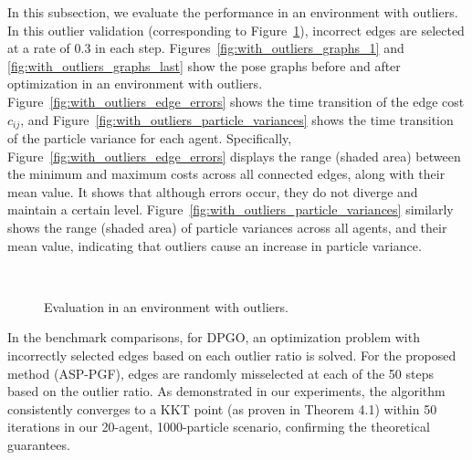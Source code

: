In this subsection, we evaluate the performance in an environment with outliers. In this outlier validation (corresponding to Figure~\ref{fig:eval_with_outliers}), incorrect edges are selected at a rate of 0.3 in each step.
Figures~\ref{fig:with_outliers_graphs_1} and \ref{fig:with_outliers_graphs_last} show the pose graphs before and after optimization in an environment with outliers.
Figure~\ref{fig:with_outliers_edge_errors} shows the time transition of the edge cost $c_{ij}$, and Figure~\ref{fig:with_outliers_particle_variances} shows the time transition of the particle variance for each agent.
Specifically, Figure~\ref{fig:with_outliers_edge_errors} displays the range (shaded area) between the minimum and maximum costs across all connected edges, along with their mean value. It shows that although errors occur, they do not diverge and maintain a certain level.
Figure~\ref{fig:with_outliers_particle_variances} similarly shows the range (shaded area) of particle variances across all agents, and their mean value, indicating that outliers cause an increase in particle variance.

\begin{figure}[H]
    \centering
    \hfill
    \\
    \hfill
    \caption{Evaluation in an environment with outliers.}
    \label{fig:eval_with_outliers}
\end{figure}


In the benchmark comparisons, for DPGO, an optimization problem with incorrectly selected edges based on each outlier ratio is solved. For the proposed method (ASP-PGF), edges are randomly misselected at each of the 50 steps based on the outlier ratio. As demonstrated in our experiments, the algorithm consistently converges to a KKT point (as proven in Theorem 4.1) within 50 iterations in our 20-agent, 1000-particle scenario, confirming the theoretical guarantees.

